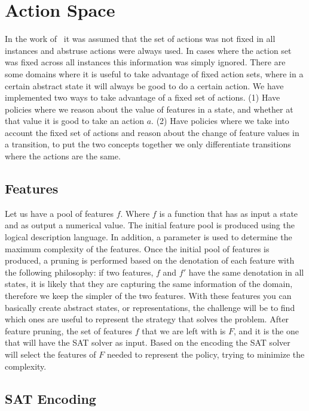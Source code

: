 \documentclass[a4paper]{article}
\begin{document}
\section{Action Space}

In the work of~\cite{frances2021learning} it was assumed that the set of actions was not fixed in all instances and abstruse actions were always used. In cases where the action set was fixed across all instances this information was simply ignored. There are some domains where it is useful to take advantage of fixed action sets, where in a certain abstract state it will always be good to do a certain action. We have implemented two ways to take advantage of a fixed set of actions. (1) Have policies where we reason about the value of features in a state, and whether at that value it is good to take an action $a$. (2) Have policies where we take into account the fixed set of actions and reason about the change of feature values in a transition, to put the two concepts together we only differentiate transitions where the actions are the same.


\subsection{Features}

Let us have a pool of features $f$. Where $f$ is a function that has as input a state and as output a numerical value. The initial feature pool is produced using the logical description language. In addition, a parameter is used to determine the maximum complexity of the features. Once the initial pool of features is produced, a pruning is performed based on the denotation of each feature with the following philosophy: if two features, $f$ and $f'$ have the same denotation in all states, it is likely that they are capturing the same information of the domain, therefore we keep the simpler of the two features. With these features you can basically create abstract states, or representations, the challenge will be to find which ones are useful to represent the strategy that solves the problem. After feature pruning, the set of features $f$ that we are left with is $F$, and it is the one that will have the SAT solver as input. Based on the encoding the SAT solver will select the features of $F$ needed to represent the policy, trying to minimize the complexity.


\subsection{SAT Encoding}
\end{document}
